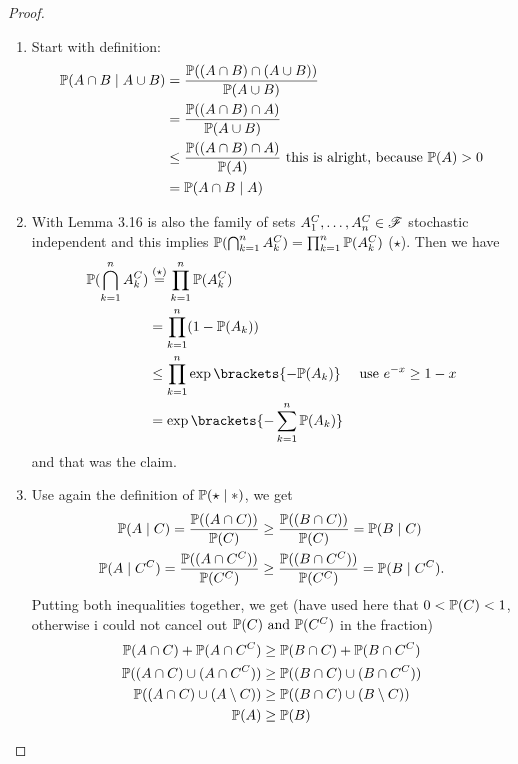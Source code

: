 \begin{proof}\
	\begin{enumerate}
		\item Start with definition:
		\begin{align*}
			\mathbb{P}(A \cap B \mid A \cup B) &= \frac{\mathbb{P}((A\cap B)\cap (A \cup B))}{\mathbb{P}(A \cup B)}\\
			&= \frac{\mathbb{P}((A\cap B)\cap A)}{\mathbb{P}(A \cup B)}\\
			&\le \frac{\mathbb{P}((A\cap B)\cap A)}{\mathbb{P}(A)} \text{ this is alright, because } \mathbb{P}(A) > 0\\
			&= \mathbb{P}(A\cap B \mid A)
		\end{align*}
		\item With Lemma 3.16 is also the family of sets $A^C_1 , \dots, A^C_n \in \mathscr{F}$ stochastic independent and this implies $\mathbb{P}(\bigcap_{k=1}^n A_k^C) = \prod_{k=1}^{n} \mathbb{P}(A_k^C)$ ($\star$). Then we have
		\begin{align*}
			\meas(\bigcap_{k=1}^n A^C_k) &\overset{(\star)}{=} \prod_{k=1}^n \meas(A_k^C)\\
			&= \prod_{k=1}^n (1-\meas(A_k))\\
			&\le \prod_{k=1}^n \exp\brackets{-\meas(A_k)} \quad \text{ use $e^{-x} \ge 1 - x$}\\
			&= \exp\brackets{-\sum_{k=1}^n \meas(A_k)}
		\end{align*}
		and that was the claim.
		\item Use again the definition of $\mathbb{P}(\star \mid \ast)$, we get
		\begin{align*}
			\mathbb{P}(A \mid C) = \frac{\mathbb{P}((A\cap C))}{\mathbb{P}(C)} &\ge \frac{\mathbb{P}((B\cap C))}{\mathbb{P}(C)} = \mathbb{P}(B\mid C)\\
			\mathbb{P}(A \mid C^C) = \frac{\mathbb{P}((A\cap C^C))}{\mathbb{P}(C^C)} &\ge \frac{\mathbb{P}((B\cap C^C))}{\mathbb{P}(C^C)} = \mathbb{P}(B\mid C^C).
		\end{align*}
		Putting both inequalities together, we get (have used here that $0 <\mathbb{P}(C)<1$, otherwise i could not cancel out $\mathbb{P}(C) \text{ and } \mathbb{P}(C^C)$ in the fraction)
		\begin{align*}
			\mathbb{P}(A \cap C) + \mathbb{P}(A \cap C^C) &\ge \mathbb{P}(B \cap C) + \mathbb{P}(B \cap C^C)\\
			\mathbb{P}((A \cap C) \cup (A \cap C^C)) &\ge \mathbb{P}((B \cap C) \cup (B \cap C^C))\\
			\mathbb{P}((A \cap C) \cup (A \setminus C)) &\ge \mathbb{P}((B \cap C) \cup (B \setminus C))\\
			\mathbb{P}(A) &\ge \mathbb{P}(B)
		\end{align*}

\end{enumerate}
\end{proof}
